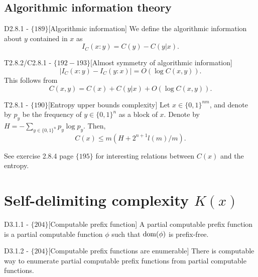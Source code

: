 \documentclass{article}
\begin{document}
\subsection{Algorithmic information theory}

\begin{flexidefinition}{D2.8.1 - $\{189\}$}[Algorithmic information]
    We define the algorithmic information about $y$ contained in $x$ as
    \begin{equation}
        I_C(x:y) = C(y) - C(y|x).
    \end{equation}
\end{flexidefinition}

\begin{flexitheorem}{T2.8.2/C2.8.1 - $\{192-193\}$}[Almost symmetry of algorithmic information]
    \begin{equation}
        |I_C(x:y) - I_C(y:x)| = O(\log C(x,y)).
    \end{equation}
    This follows from
    \begin{equation}
        C(x,y) = C(x) + C(y|x) + O(\log C(x,y)).
    \end{equation}
\end{flexitheorem}


\begin{flexitheorem}{T2.8.1 - $\{190\}$}[Entropy upper bounds complexity]
    Let $x \in \{0,1\}^{nm}$, and denote by $p_y$ be the frequency of $y \in \{0,1\}^n$ as a block of $x$. Denote by $H = - \sum_{y \in \{0,1\}^n} p_y \log p_y$. Then,
    \begin{equation}
        C(x) \leq m (H + 2^{n+1}l(m)/m).
    \end{equation} 
\end{flexitheorem}

See exercise 2.8.4 page $\{195\}$ for interesting relations between $C(x)$ and the entropy.

\section{Self-delimiting complexity $K(x)$}

\begin{flexidefinition}{D3.1.1 - $\{204\}$}[Computable prefix function]
    A partial computable prefix function is a partial computable function $\phi$ such that $\operatorname{dom}(\phi)$ is prefix-free.
\end{flexidefinition}

\begin{flexitheorem}{D3.1.2 - $\{204\}$}[Computable prefix functions are enumerable]
    There is computable way to enumerate partial computable prefix functions from partial computable functions.
\end{flexitheorem}
\end{document}
